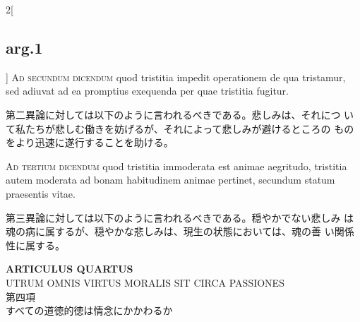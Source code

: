 \documentclass[paper=a4paper,fontsize=10pt,jafontsize=9pt,titlepage]{jlreq}
\begin{document}
\begin{paracol}{2}[\subsection{arg.1}]
{\scshape Ad secundum dicendum} quod tristitia impedit operationem de
qua tristamur, sed adiuvat ad ea promptius exequenda per quae
tristitia fugitur.

\switchcolumn

第二異論に対しては以下のように言われるべきである。悲しみは、それにつ
 いて私たちが悲しむ働きを妨げるが、それによって悲しみが避けるところの
 ものをより迅速に遂行することを助ける。

\switchcolumn*[\subsection{ad.3}]

{\scshape Ad tertium dicendum} quod tristitia immoderata est animae
aegritudo, tristitia autem moderata ad bonam habitudinem animae
pertinet, secundum statum praesentis vitae.

\switchcolumn

第三異論に対しては以下のように言われるべきである。穏やかでない悲しみ
 は魂の病に属するが、穏やかな悲しみは、現生の状態においては、魂の善
 い関係性に属する。

\end{paracol}
\newpage
{}
{}
\setcounter{section}{4}
\setcounter{subsection}{0}


\begin{center}
{\Large {\bfseries ARTICULUS QUARTUS}}\\
{\large UTRUM OMNIS VIRTUS MORALIS SIT CIRCA PASSIONES}\\
{\Large 第四項\\すべての道徳的徳は情念にかかわるか}
\end{center}
\end{document}
